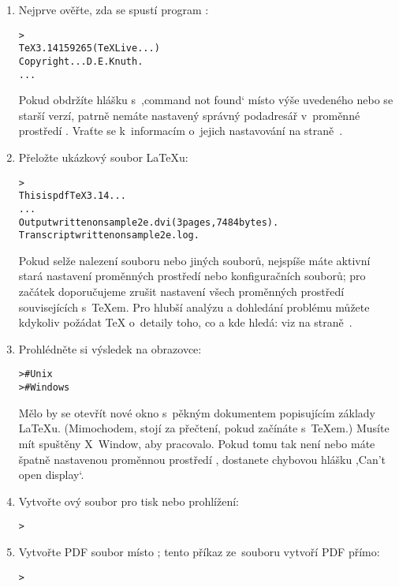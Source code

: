\documentclass[\classoptions,slovak,english,czech]{\classname}
\newcommand{\singleuv}[1]{,#1`}
\begin{document}
\begin{enumerate}
\item Nejprve ověřte, zda se spustí program :

\begin{alltt}
> 
TeX 3.14159265 (TeX Live ...)
Copyright ... D.E. Knuth.
...
\end{alltt}
Pokud obdržíte hlášku s~\singleuv{command not found} místo výše 
uvedeného nebo se starší verzí, patrně nemáte nastavený správný podadresář
 v~proměnné prostředí .  Vraťte se
k~informacím o~jejich nastavování na straně~\pageref{sec:env}.

\item Přeložte ukázkový soubor \LaTeX{}u:
\begin{alltt}
> 
This is pdfTeX 3.14...
...
Output written on sample2e.dvi (3 pages, 7484 bytes).
Transcript written on sample2e.log.
\end{alltt}
Pokud selže nalezení souboru  nebo jiných
souborů, nejspíše máte aktivní stará nastavení proměnných prostředí nebo
konfiguračních souborů; pro začátek doporučujeme zrušit 
nastavení všech proměnných prostředí souvisejících s~\TeX{}em.
Pro hlubší analýzu a dohledání problému můžete kdykoliv požádat
\TeX{} o~detaily toho, co a kde hledá: viz 
na straně~\pageref{sec:debugging}.

\item Prohlédněte si výsledek na obrazovce:
\begin{alltt}
>     # Unix
>   # Windows
\end{alltt}
Mělo by se otevřít nové okno s~pěkným dokumentem popisujícím základy
\LaTeX{}u.  (Mimochodem, stojí za přečtení, pokud začínáte s~\TeX em.)  
Musíte mít spuštěny
X~Window, aby  pracovalo. Pokud tomu tak není nebo máte
špatně nastavenou proměnnou prostředí
, dostanete chybovou hlášku \singleuv{Can't open display}.

\item Vytvořte \PS{}ový soubor pro tisk nebo prohlížení:
\begin{alltt}
> 
\end{alltt}

\item Vytvořte PDF soubor místo \dvi{}; tento příkaz
ze~souboru  vytvoří PDF přímo:
\begin{alltt}
> 
\end{alltt}


\end{enumerate}
\end{document}
